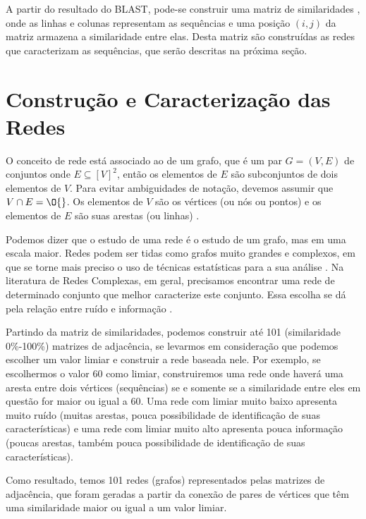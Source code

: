
A partir do resultado do BLAST, pode-se construir uma matriz de similaridades \cite{andrade2006}, onde as linhas e colunas representam as sequências e
uma posição $(i, j)$ da matriz armazena a similaridade entre elas. Desta matriz são construídas as redes que caracterizam as sequências, que serão
descritas na próxima seção.

\section{Construção e Caracterização das Redes} \label{sec:conscarac}

O conceito de rede está associado ao de um grafo, que é um par $G = (V, E)$ de conjuntos onde $E \subseteq [V]^2$, então os elementos de $E$
são subconjuntos de dois elementos de $V$. Para evitar ambiguidades de notação, devemos assumir que $V \cap E = \O{}$. Os elementos de $V$ são os vértices
(ou nós ou pontos) e os elementos de $E$ são suas arestas (ou linhas) \cite{reinhard2010}.

Podemos dizer que o estudo de uma rede é o estudo de um grafo, mas em uma escala maior. Redes podem ser tidas como grafos muito grandes e complexos,
em que se torne mais preciso o uso de técnicas estatísticas para a sua análise \cite{bessa2008}. Na literatura de Redes Complexas, em geral, precisamos
encontrar uma rede de determinado conjunto que melhor caracterize este conjunto. Essa escolha se dá pela relação entre ruído e informação \cite{barabasi2004}.

Partindo da matriz de similaridades, podemos construir até 101 (similaridade 0\%-100\%) matrizes de adjacência, se levarmos em consideração que podemos
escolher um valor limiar e construir a rede baseada nele. Por exemplo, se escolhermos o valor 60 como limiar, construiremos uma rede onde haverá uma aresta
entre dois vértices (sequências) se e somente se a similaridade entre eles em questão for maior ou igual a 60. Uma rede com limiar muito baixo apresenta muito
ruído (muitas arestas, pouca possibilidade de identificação de suas características) e uma rede com limiar muito alto apresenta pouca informação (poucas
arestas, também pouca possibilidade de identificação de suas características).

Como resultado, temos 101 redes (grafos) representados pelas matrizes de adjacência, que foram geradas a partir da conexão de pares de vértices que
têm uma similaridade maior ou igual a um valor limiar.

